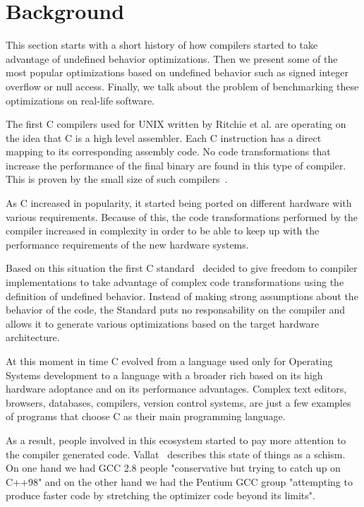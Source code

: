 \section{Background} \label{sec:bg}

This section starts with a short history of how compilers started to
take advantage of undefined behavior optimizations. Then we present some
of the most popular optimizations based on undefined behavior such as
signed integer overflow or null access. Finally, we talk about the
problem of benchmarking these optimizations on real-life software.

The first C compilers used for UNIX written by Ritchie et al. are
operating on the idea that C is a high level assembler. Each C
instruction has a direct mapping to its corresponding assembly code. No
code transformations that increase the performance of the final binary
are found in this type of compiler. This is proven by the small size of
such compilers~\cite{ritchiecomp}. 

As C increased in popularity, it started being ported on different
hardware with various requirements. Because of this, the code
transformations performed by the compiler increased in complexity in
order to be able to keep up with the performance requirements of the new
hardware systems.

Based on this situation the first C standard~\cite{iso90} decided to
give freedom to compiler implementations to take advantage of complex
code transformations using the definition of undefined behavior. Instead
of making strong assumptions about the behavior of the code, the
Standard puts no responsability on the compiler and allows it to
generate various optimizations based on the target hardware
architecture.

At this moment in time C evolved from a language used only for Operating
Systems development to a language with a broader rich based on its high
hardware adoptance and on its performance advantages. Complex text
editors, browsers, databases, compilers, version control systems,
are just a few examples of programs that choose C as their main
programming language.

As a result, people involved in this ecosystem started to pay more
attention to the compiler generated code. Vallat~\cite{vallat} describes
this state of things as a schism. On one hand we had GCC 2.8 people
"conservative but trying to catch up on C++98" and on the other hand we
had the Pentium GCC group "attempting
to produce faster code by stretching the optimizer code beyond its
limits".

